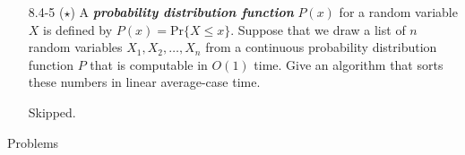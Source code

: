 \documentclass{report}
\makeatletter
\renewenvironment{framed}{%
 \def\FrameCommand##1{\hskip\@totalleftmargin
 \fboxsep=\FrameSep\fbox{##1}}%
 \MakeFramed {\advance\hsize-\width
   \@totalleftmargin\z@ \linewidth\hsize
   \@setminipage}}%
 {\par\unskip\endMakeFramed}
\makeatother
\begin{document}
\begin{enumerate}
\begin{framed}
\end{framed}

\item[8.4-5]{($\star$) A \textbf{\emph{probability distribution function}}
$P(x)$ for a random variable $X$ is defined by $P(x) = \text{Pr}\{X \le x\}$.
Suppose that we draw a list of $n$ random variables $X_1, X_2, \dots, X_n$ from
a continuous probability distribution function $P$ that is computable in $O(1)$
time. Give an algorithm that sorts these numbers in linear average-case time.}

\begin{framed}
Skipped.
\end{framed}

\end{enumerate}

\newpage

{\large Problems}
\end{document}
